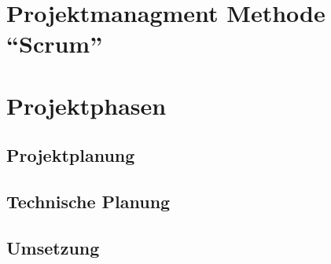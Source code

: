\hypertarget{projektmanagment-methode-scrum}{%
\section{Projektmanagment Methode
``Scrum''}\label{projektmanagment-methode-scrum}}

\hypertarget{projektphasen}{%
\section{Projektphasen}\label{projektphasen}}

\hypertarget{projektplanung}{%
\subsection{Projektplanung}\label{projektplanung}}

\hypertarget{technische-planung}{%
\subsection{Technische Planung}\label{technische-planung}}

\hypertarget{umsetzung}{%
\subsection{Umsetzung}\label{umsetzung}}
